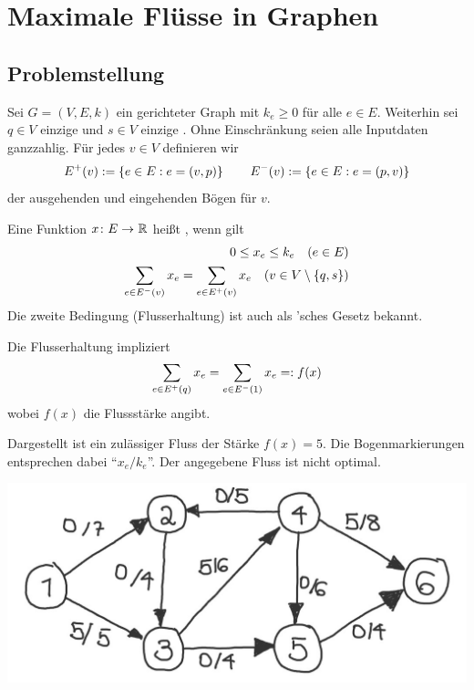 \section{Maximale Flüsse in Graphen}

\subsection{Problemstellung}

Sei $G = (V,E,k)$ ein gerichteter Graph mit  $k_e \ge 0$ für alle $e \in E$. Weiterhin sei $q \in V$ einzige  und $s \in V$ einzige . Ohne Einschränkung seien alle Inputdaten ganzzahlig. Für jedes $v \in V$ definieren wir
\begin{equation*}
	E^+(v) \mathrel{:=} \left\{ e \in E : e = (v,p) \right\} \qquad E^-(v) \mathrel{:=} \left\{ e \in E : e = (p,v) \right\}
\end{equation*}
der ausgehenden und eingehenden Bögen für $v$.

\begin{definition}
	Eine Funktion $\abb{x}{E}{\R}$ heißt , wenn gilt
	\begin{equation*}
		\begin{aligned}
			0 \le x_e \le k_e \quad (e \in E) \\
			\sum_{e \in E^-(v)} x_e = \sum_{e \in E^+(v)} x_e \quad (v \in V \setminus \left\{ q,s \right\})
		\end{aligned}
	\end{equation*}
	Die zweite Bedingung (Flusserhaltung) ist auch als 'sches Gesetz bekannt.
\end{definition}

Die Flusserhaltung impliziert
\begin{equation*}
	\sum_{e \in E^+(q)} x_e = \sum_{e \in E^-(1)} x_e \mathrel{=:} f(x)
\end{equation*}
wobei $f(x)$ die Flussstärke angibt.

\begin{beispiel} \label{beispiel: 5.3}
	Dargestellt ist ein zulässiger Fluss der Stärke $f(x) = 5$. Die Bogenmarkierungen entsprechen dabei \enquote{$x_e / k_e$}. Der angegebene Fluss ist nicht optimal.

	\begin{center}
		\includegraphics[width=.5\linewidth]{./img/optinum_5_4_bsp5-3.jpg}
	\end{center}
\end{beispiel}

